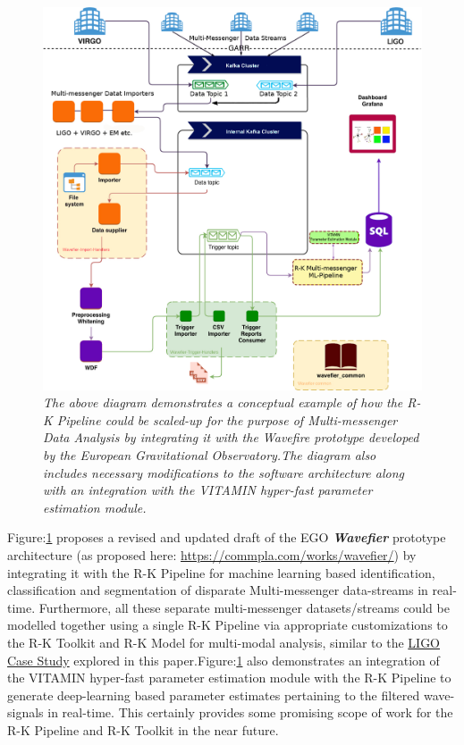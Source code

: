 \begin{figure}[H]
	\centering
	\includegraphics[width=1.0\linewidth]{images/RK_Pipeline_with_Wavefire_VITAMIN.jpg}
	\caption{\textit{The above diagram demonstrates a conceptual example of how the R-K Pipeline could be scaled-up for the purpose of Multi-messenger Data Analysis by integrating it with the Wavefire prototype developed by the European Gravitational Observatory.The diagram also includes necessary modifications to the software architecture along with an integration with the VITAMIN hyper-fast parameter estimation module. }}
	\label{fig:Wavefier_RKPipeline}
\end{figure} 

Figure:\ref{fig:Wavefier_RKPipeline} proposes a revised and updated draft of the EGO \textbf{\textit{Wavefier}} prototype architecture (as proposed here: \url{https://commpla.com/works/wavefier/}) by integrating it with the R-K Pipeline for machine learning based identification, classification and segmentation of disparate Multi-messenger data-streams in real-time. Furthermore, all these separate multi-messenger datasets/streams could be modelled together using a single R-K Pipeline via appropriate customizations to the R-K Toolkit and R-K Model for multi-modal analysis, similar to the \hyperref[sec:LIGO_Data_Analysis]{LIGO Case Study} explored in this paper.Figure:\ref{fig:Wavefier_RKPipeline} also demonstrates an integration of the VITAMIN hyper-fast parameter estimation module with the R-K Pipeline to generate deep-learning based parameter estimates pertaining to the filtered wave-signals in real-time. This certainly provides some promising scope of work for the R-K Pipeline and R-K Toolkit in the near future.


